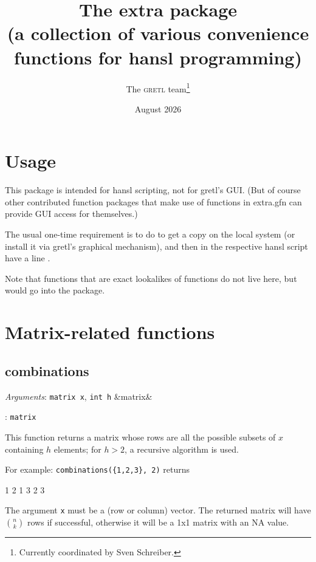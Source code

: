 \documentclass[11pt,english]{article}
\newcommand{\noun}[1]{\textsc{#1}}
\newcommand{\ArgRet}[2]{%
  {\it Arguments}: {#1}%
  \ifx&#2&%
  \else
  \par\smallskip\noindent {\it Return type}: \texttt{#2}
  \fi%
  \par\medskip\par%
  }
\begin{document}
\title{The extra package\\
(a collection of various convenience functions for hansl programming) }

\date{August 2026}

\author{The \noun{gretl} team\thanks{Currently coordinated by Sven
Schreiber.}}

\maketitle
\tableofcontents{}

\section{Usage}

This package is intended for hansl scripting, not for gretl's GUI.
(But of course other contributed function packages that make use of
functions in extra.gfn can provide GUI access for themselves.)

The usual one-time requirement is to do 
to get a copy on the local system (or install it via gretl's graphical
mechanism), and then in the respective hansl script have a line .

Note that functions that are exact lookalikes of 
functions do not live here, but would go into the
 package.


\section{Matrix-related functions}

\subsection{combinations}

\ArgRet{\texttt{matrix x}, \texttt{int h}}{matrix} This function
returns a matrix whose rows are all the possible subsets of $x$
containing $h$ elements; for $h>2$, a recursive algorithm is used.

For example: \texttt{combinations(\{1,2,3\}, 2)} returns
\begin{code}
         1   2
         1   3
         2   3
\end{code}

The argument \texttt{x} must be a (row or column) vector. The returned
matrix will have $n \choose k$ rows if successful, otherwise it will be a 1x1
matrix with an NA value.
\end{document}
